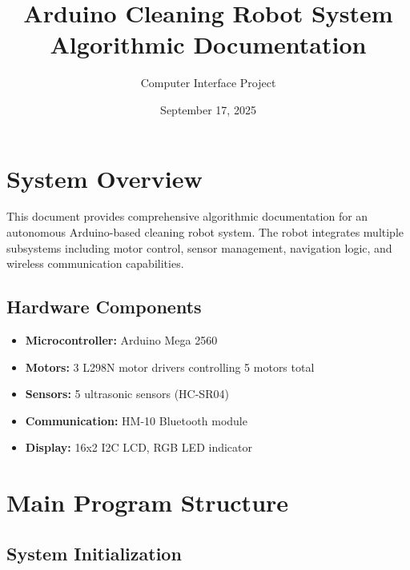 \documentclass[12pt]{article}
\title{\textbf{Arduino Cleaning Robot System\\Algorithmic Documentation}}
\author{Computer Interface Project}
\date{September 17, 2025}
\begin{document}
\maketitle
\tableofcontents
\newpage

\section{System Overview}

This document provides comprehensive algorithmic documentation for an autonomous Arduino-based cleaning robot system. The robot integrates multiple subsystems including motor control, sensor management, navigation logic, and wireless communication capabilities.

\subsection{Hardware Components}
\begin{itemize}
    \item \textbf{Microcontroller:} Arduino Mega 2560
    \item \textbf{Motors:} 3 L298N motor drivers controlling 5 motors total
    \item \textbf{Sensors:} 5 ultrasonic sensors (HC-SR04)
    \item \textbf{Communication:} HM-10 Bluetooth module
    \item \textbf{Display:} 16x2 I2C LCD, RGB LED indicator
\end{itemize}

\section{Main Program Structure}

\subsection{System Initialization}
\end{document}
